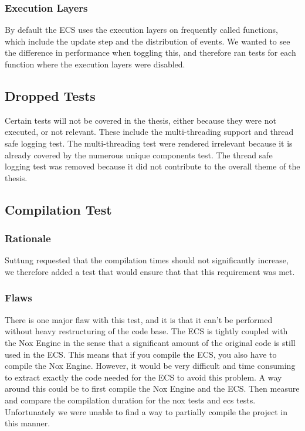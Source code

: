 \subsubsection{Execution Layers}
By default the ECS uses the execution layers on frequently called functions,
which include the update step and the distribution of events.
We wanted to see the difference in performance when toggling this,
and therefore ran tests for each function where the execution layers were disabled.

\subsection{Dropped Tests}
Certain tests will not be covered in the thesis, either because they were not executed, or not relevant.
These include the multi-threading support and thread safe logging test.
The multi-threading test were rendered irrelevant because it is already covered by the numerous unique components test.
The thread safe logging test was removed because it did not contribute to the overall theme of the thesis.

\subsection{Compilation Test}
\subsubsection{Rationale}
Suttung requested that the compilation times should not significantly increase,
we therefore added a test that would ensure that that this requirement was met.

\subsubsection{Flaws}
There is one major flaw with this test, and it is that it can't be performed without heavy restructuring of the code base.
The ECS is tightly coupled with the Nox Engine in the sense that a significant amount of the original code is still used in the ECS.
This means that if you compile the ECS, you also have to compile the Nox Engine.
However, it would be very difficult and time consuming to extract exactly the code needed for the ECS to avoid this problem.
A way around this could be to first compile the Nox Engine and the ECS.
Then measure and compare the compilation duration for the nox tests and ecs tests.
Unfortunately we were unable to find a way to partially compile the project in this manner.

